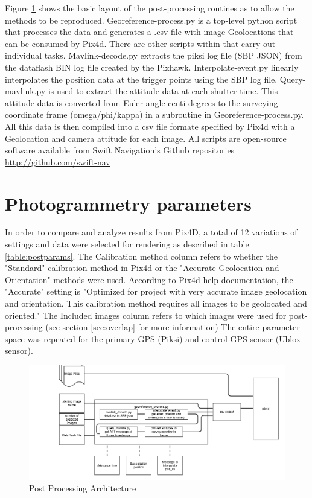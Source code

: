 \documentclass{article}
\begin{document}
Figure \ref{postprocess} shows the basic layout of the post-processing routines as to allow the methods to be reproduced.  Georeference-process.py is a top-level python script that processes the data and generates a .csv file with image Geolocations that can be consumed by Pix4d. There are other scripts within that carry out individual tasks. Mavlink-decode.py extracts the piksi log file (SBP JSON) from the dataflash BIN log file created by the Pixhawk. Interpolate-event.py linearly interpolates the position data at the trigger points using the SBP log file. Query-mavlink.py is used to extract the attitude data at each shutter time. This attitude data is converted from Euler angle centi-degrees to the surveying coordinate frame (omega/phi/kappa) in a subroutine in Georeference-process.py. All this data is then compiled into a csv file formate specified by Pix4d with a Geolocation and camera attitude for each image.  All scripts are open-source software available from Swift Navigation's Github repositories \url{http://github.com/swift-nav}

\section{Photogrammetry parameters}
In order to compare and analyze results from Pix4D, a total of 12 variations of settings and data were selected for rendering as described in table \ref{table:postparams}.  The Calibration method column refers to whether the "Standard" calibration method in Pix4d or the "Accurate Geolocation and Orientation" methods were used.  According to Pix4d help documentation, the "Accurate" setting is "Optimized for project with very accurate image geolocation and orientation. This calibration method requires all images to be geolocated and oriented."\cite{pix4d_support1}  The Included images column refers to which images were used for post-processing (see section \ref{sec:overlap} for more information)
The entire parameter space was repeated for the primary GPS (Piksi) and control GPS sensor (Ublox sensor).


\begin{figure}
\begin{center}
\includegraphics[width=7in]{images/flow_charts/uav_survey_processing_architecture.png}
\caption{Post Processing Architecture}
\label{postprocess}
\end{center}
\end{figure}
\end{document}
